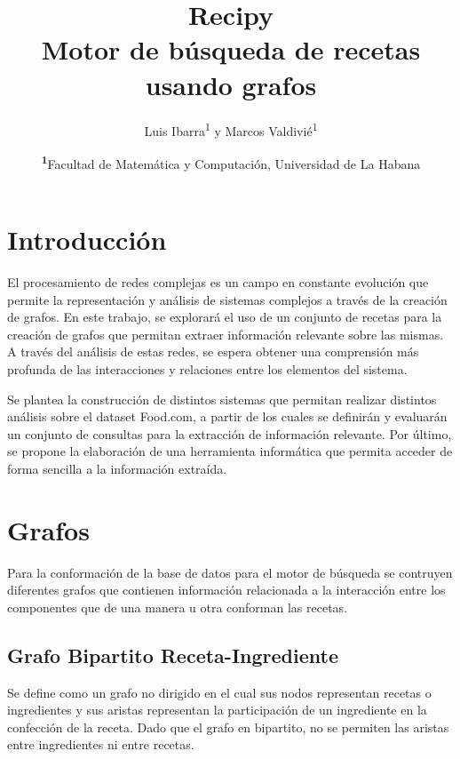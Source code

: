 \documentclass[
	a4paper, %
	10pt, %
	unnumberedsections, %
	twoside, %
]{LTJournalArticle}
\title{Recipy\\Motor de búsqueda de recetas usando grafos} %
\author{%
	Luis Ibarra\textsuperscript{1} y Marcos Valdivié\textsuperscript{1} 
}
\date{\footnotesize\textsuperscript{\textbf{1}}Facultad de Matemática y Computación, Universidad de La Habana}
\begin{document}
\maketitle %


\section{Introducción}

El procesamiento de redes complejas es un campo en constante evolución que permite la representación y análisis de sistemas complejos a través de la creación de grafos. En este trabajo, se explorará el uso de un conjunto de recetas para la creación de grafos que permitan extraer información relevante sobre las mismas. A través del análisis de estas redes, se espera obtener una comprensión más profunda de las interacciones y relaciones entre los elementos del sistema. 

Se plantea la construcción de distintos sistemas que permitan realizar distintos análisis sobre el dataset Food.com, a partir de los cuales se definirán y evaluarán un conjunto de consultas para la extracción de información relevante. Por último, se propone la elaboración de una herramienta informática que permita acceder de forma sencilla a la información extraída.



\section{Grafos}

Para la conformación de la base de datos para el motor de búsqueda se contruyen diferentes grafos que
contienen información relacionada a la interacción entre los componentes que de una manera u otra conforman
las recetas.

\subsection{Grafo Bipartito Receta-Ingrediente}

Se define como un grafo no dirigido en el cual sus nodos representan
recetas o ingredientes y sus aristas representan la participación de un ingrediente en la confección de la receta.
Dado que el grafo en bipartito, no se permiten las aristas entre ingredientes ni entre recetas.
\end{document}
